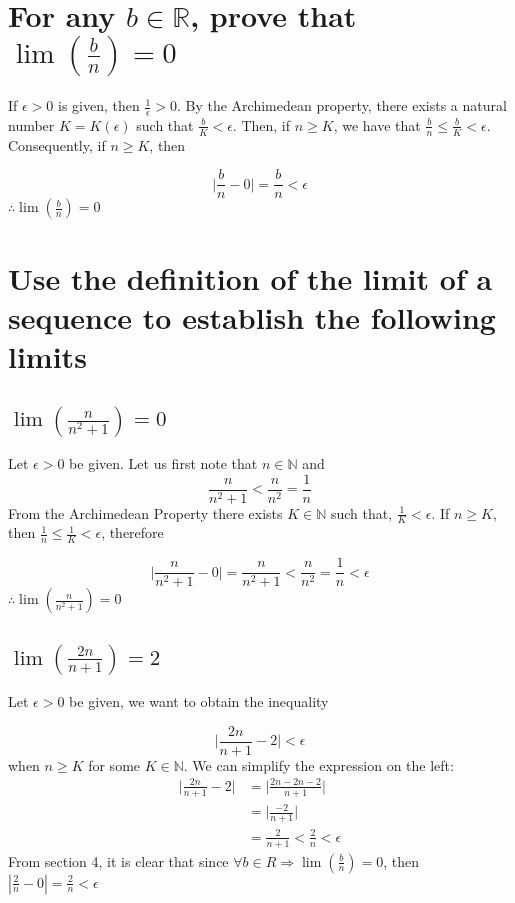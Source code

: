 \documentclass{article}
\begin{document}
\section{For any $b \in \mathbb{R}$, prove that $\lim(\frac{b}{n}) = 0$}
If $\epsilon > 0$ is given, then $\frac{1}{\epsilon} > 0$. By the Archimedean property, there exists a natural number $K = K(\epsilon)$ such that $\frac{b}{K} < \epsilon$.
Then, if $n \ge K$, we have that $\frac{b}{n} \le \frac{b}{K} < \epsilon$. Consequently, if $n \ge K$, then 

\begin{equation*}
    \Big|\frac{b}{n} - 0 \Big| = \frac{b}{n} < \epsilon 
\end{equation*}
$\therefore \lim(\frac{b}{n}) = 0$ 

\section{Use the definition of the limit of a sequence to establish the following limits}
\subsection{$\lim(\frac{n}{n^2 + 1}) = 0$}
Let $\epsilon > 0$ be given. Let us first note that $n \in \mathbb{N}$ and
\begin{equation*}
    \frac{n}{n^2 + 1} < \frac{n}{n^2} = \frac{1}{n}
\end{equation*}
From the Archimedean Property there exists $K \in \mathbb{N}$ such that, $\frac{1}{K} < \epsilon$.
If $n \ge K$, then $\frac{1}{n} \le \frac{1}{K} < \epsilon$, therefore 

\begin{equation*}
    \Big| \frac{n}{n^2 + 1} - 0 \Big| = \frac{n}{n^2 + 1} < \frac{n}{n^2} = \frac{1}{n} < \epsilon
\end{equation*}
$\therefore \lim(\frac{n}{n^2 + 1}) = 0$

\subsection{$\lim(\frac{2n}{n + 1}) = 2$}
Let $\epsilon > 0$ be given, we want to obtain the inequality 

\begin{equation*}
    \Big| \frac{2n}{n + 1} - 2 \Big| < \epsilon
\end{equation*}
when $n \ge K$ for some $K \in \mathbb{N}$. We can simplify the expression on the left:
\begin{align*}
    \Big| \frac{2n}{n + 1} - 2 \Big| & = \Big| \frac{2n - 2n - 2}{n + 1} \Big| \\
                                     & = \Big| \frac{-2}{n + 1} \Big| \\
                                    & = \frac{2}{n + 1} < \frac{2}{n} < \epsilon
\end{align*}
From section 4, it is clear that since $\forall b \in R \Rightarrow \lim(\frac{b}{n}) = 0$, then $| \frac{2}{n} - 0 | = \frac{2}{n} < \epsilon$\\
\end{document}
